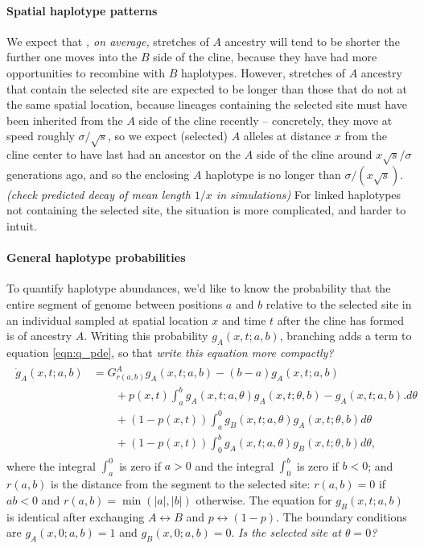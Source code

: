 \documentclass[12pt]{article}
\newcommand{\alisa}[1]{{\em \color{red} #1}}
\newcommand{\plr}[1]{{\em \color{blue} #1}}
\begin{document}
\paragraph{Spatial haplotype patterns}
We expect that\alisa{, on average,} stretches of $A$ ancestry will tend to be shorter the further one moves into the $B$ side of the cline,
because they have had more opportunities to recombine with $B$ haplotypes.
However, stretches of $A$ ancestry that contain the selected site are expected to be longer
than those that do not at the same spatial location,
because lineages containing the selected site must have been inherited from the $A$ side of the cline recently --
concretely, they move at speed roughly $\sigma/\sqrt{s}$,
so we expect (selected) $A$ alleles at distance $x$ from the cline center
to have last had an ancestor on the $A$ side of the cline around $x \sqrt{s}/\sigma$ generations ago,
and so the enclosing $A$ haplotype is no longer than $\sigma/(x \sqrt{s})$.
\plr{(check predicted decay of mean length $1/x$ in simulations)}
For linked haplotypes not containing the selected site, the situation is more complicated, and harder to intuit.

\paragraph{General haplotype probabilities}
To quantify haplotype abundances,
we'd like to know the probability that the entire segment of genome between positions $a$ and $b$ relative to the selected site
in an individual sampled at spatial location $x$ and time $t$ after the cline has formed
is of ancestry $A$.
Writing this probability $g_A(x,t;a,b)$,
branching adds a term to equation \eqref{eqn:q_pde}, so that 
\plr{write this equation more compactly?}
\begin{align}
    \begin{aligned} \label{eqn:g_pde}
        \dot g_A(x,t;a,b) 
            &= G_{r(a,b)}^A g_A(x,t;a,b) 
            - (b-a) g_A(x,t;a,b) 
            \\ {} & \qquad 
            + p(x,t) \int_a^b {
                g_A(x,t;a,\theta) g_A(x,t;\theta,b) 
                - g_A(x,t;a,b) .
            } d\theta
            \\ {} & \qquad 
            + (1-p(x,t)) \int_a^0 {
                g_B(x,t;a,\theta) g_A(x,t;\theta,b)
            } d\theta
            \\ {} & \qquad 
            + (1-p(x,t)) \int_0^b {
                g_A(x,t;a,\theta) g_B(x,t;\theta,b)
            } d\theta,
    \end{aligned}
\end{align}
where the integral $\int_a^0$ is zero if $a>0$ and the integral $\int_0^b$ is zero if $b<0$;
and $r(a,b)$ is the distance from the segment to the selected site:
$r(a,b)=0$ if $ab<0$ and $r(a,b)=\min(|a|,|b|)$ otherwise.
The equation for $g_B(x,t;a,b)$ is identical after exchanging $A \leftrightarrow B$ and
$p \leftrightarrow (1-p)$.
The boundary conditions are $g_A(x,0;a,b)=1$ and $g_B(x,0;a,b)=0$.
\alisa{Is the selected site at $\theta=0$?}
\end{document}
